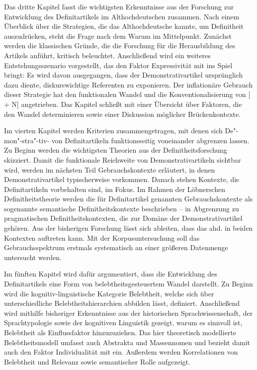 Das dritte Kapitel fasst die wichtigsten Erkenntnisse aus der Forschung zur Entwicklung des Definitartikels im Althochdeutschen zusammen. Nach einem Überblick über die Strategien, die das Althochdeutsche kannte, um Definitheit auszudrücken, steht die Frage nach dem Warum im Mittelpunkt. Zunächst werden die klassischen Gründe, die die Forschung für die Herausbildung des Artikels anführt, kritisch beleuchtet. Anschließend wird ein weiteres Entstehungsszenario vorgestellt, das den Faktor Expressivität mit ins Spiel bringt: Es wird davon ausgegangen, dass der Demonstrativartikel ursprünglich dazu diente, diskurswichtige Referenten zu exponieren. Der inflationäre Gebrauch dieser Strategie hat den funktionalen Wandel und die Konventionalisierung von [ + N] angetrieben. Das Kapitel schließt mit einer Übersicht über Faktoren, die den Wandel determinieren sowie einer Diskussion möglicher Brückenkontexte. 

Im vierten Kapitel werden Kriterien zusammengetragen, mit denen sich De"-mon"-stra"-tiv- von Definitartikeln funktionsseitig voneinander abgrenzen lassen. Zu Beginn werden die wichtigsten Theorien aus der Definitheitsforschung  skizziert. Damit die funktionale Reichweite von Demonstrativartikeln sichtbar wird, werden im nächsten Teil Gebrauchskontexte erläutert, in denen Demonstrativartikel typischerweise vorkommen. Danach stehen Kontexte, die  Definitartikeln vorbehalten sind, im Fokus. 
Im Rahmen der Löbnerschen Definitheitstheorie \parencite{Lobner1985}  werden die für Definitartikel genannten Gebrauchskontexte als sogenannte semantische Definitheitskontexte beschrieben -- in Abgrenzung zu  pragmatischen Definitheitskontexten, die zur Domäne der Demonstrativartikel gehören. Aus der bisherigen Forschung lässt sich ableiten, dass das ahd.  in beiden Kontexten auftreten kann. Mit der Korpusuntersuchung soll das Gebrauchsspektrum erstmals systematisch an einer größeren Datenmenge untersucht werden. 

Im fünften Kapitel wird dafür argumentiert, dass die Entwicklung des Definitartikels eine Form von belebtheitsgesteuertem Wandel darstellt. Zu Beginn wird die kognitiv-linguistische Kategorie Belebtheit, welche sich über unterschiedliche Belebtheitshierarchien abbilden lässt, definiert. Anschließend wird mithilfe bisheriger Erkenntnisse aus der historischen Sprachwissenschaft, der Sprachtypologie sowie der kognitiven Linguistik gezeigt, warum es sinnvoll ist, Belebtheit als Einflussfaktor hinzuzuziehen. Das hier theoretisch modellierte Belebtheitsmodell umfasst auch Abstrakta und Massennomen und bezieht damit auch den Faktor Individualität mit ein. Außerdem werden Korrelationen von Belebtheit und Relevanz sowie semantischer Rolle aufgezeigt.

